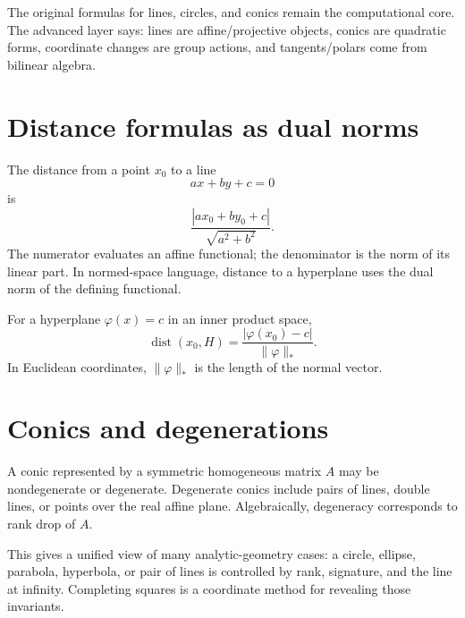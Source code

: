 The original formulas for lines, circles, and conics remain the computational core.  The advanced layer says: lines are affine/projective objects, conics are quadratic forms, coordinate changes are group actions, and tangents/polars come from bilinear algebra.

\section{Distance formulas as dual norms}

The distance from a point $x_0$ to a line
\[
  ax+by+c=0
\]
is
\[
  \frac{|ax_0+by_0+c|}{\sqrt{a^2+b^2}}.
\]
The numerator evaluates an affine functional; the denominator is the norm of its linear part.  In normed-space language, distance to a hyperplane uses the dual norm of the defining functional.

For a hyperplane $\varphi(x)=c$ in an inner product space,
\[
  \operatorname{dist}(x_0,H)=\frac{|\varphi(x_0)-c|}{\|\varphi\|_*}.
\]
In Euclidean coordinates, $\|\varphi\|_*$ is the length of the normal vector.

\section{Conics and degenerations}

A conic represented by a symmetric homogeneous matrix $A$ may be nondegenerate or degenerate.  Degenerate conics include pairs of lines, double lines, or points over the real affine plane.  Algebraically, degeneracy corresponds to rank drop of $A$.

This gives a unified view of many analytic-geometry cases: a circle, ellipse, parabola, hyperbola, or pair of lines is controlled by rank, signature, and the line at infinity.  Completing squares is a coordinate method for revealing those invariants.
